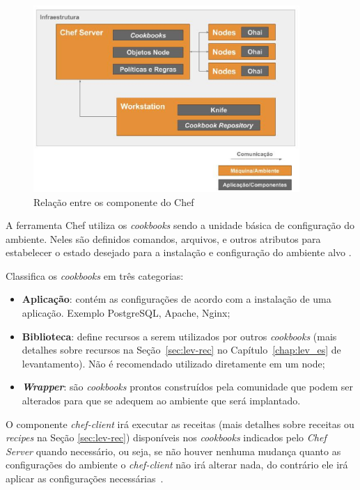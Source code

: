\begin{figure}[]
  \centering
  \includegraphics[width=0.9\textwidth]{figuras/chef-comp.eps}
  \caption{Relação entre os componente do Chef}
  \label{fig:chef-comp}
\end{figure}

A ferramenta Chef utiliza os \textit{cookbooks} sendo a unidade básica de configuração do
ambiente. Neles são definidos comandos, arquivos, e outros atributos
para estabelecer o estado desejado para a instalação e configuração
do ambiente alvo \cite{sharma:2015}.

 Classifica os \textit{cookbooks} em três categorias:
\begin{itemize}
  \item \textbf{Aplicação}: contém as configurações de acordo com a instalação de
    uma aplicação. Exemplo PostgreSQL, Apache, Nginx;
  \item \textbf{Biblioteca}: define recursos a serem utilizados por outros \textit{cookbooks}
    (mais detalhes sobre recursos na Seção~\ref{sec:lev-rec} no Capítulo~\ref{chap:lev_es} de levantamento).
    Não é recomendado utilizado diretamente em um node;
  \item \textbf{\textit{Wrapper}}: são \textit{cookbooks} prontos construídos pela comunidade que podem
    ser alterados para que se adequem ao ambiente que será implantado.
\end{itemize}

O componente \textit{chef-client} irá executar as receitas (mais detalhes sobre receitas ou
\textit{recipes} na Seção \ref{sec:lev-rec}) disponíveis nos \textit{cookbooks}
indicados pelo \textit{Chef Server} quando necessário, ou seja, se não houver
nenhuma mudança quanto as configurações do ambiente o \textit{chef-client} não irá
alterar nada, do contrário ele irá aplicar as configurações necessárias~\cite{chefdoc:2016}.




